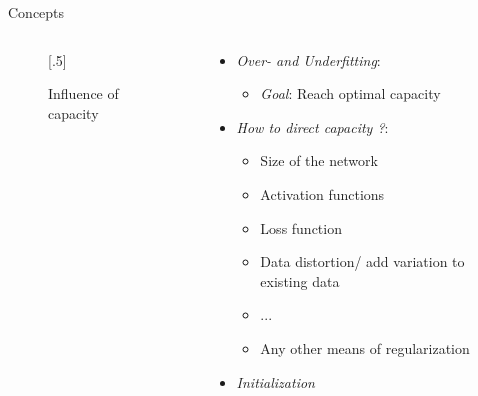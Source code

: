 \documentclass[usenames,dvipsnames,Nike,mathserif]{tuberlinbeamer}
\begin{document}
\begin{frame}[fragile]{Concepts}
	\begin{columns}
		\begin{column}{.5\textwidth}
			\begin{figure}
				\scalebox{.5}[.5]{}
				\caption{Influence of capacity}
			\end{figure}
		\end{column}
		\begin{column}{.5\textwidth}
			\begin{itemize}
				\item \emph{Over- and Underfitting}:
					\begin{itemize}
						\item<2->\emph{Goal}: Reach optimal capacity
					\end{itemize}
				\item<3->\emph{How to direct capacity ?}:
				\begin{itemize}
					\item<4-> Size of the network
					\item<5-> Activation functions
					\item<6-> Loss function
					\item<7-> Data distortion/ add variation to existing data
					\item<8-> ...
					\item<8-> Any other means of regularization
				\end{itemize}
				\item<5->\emph{Initialization}
			\end{itemize}
		\end{column}
	\end{columns}
\end{frame}
\end{document}
